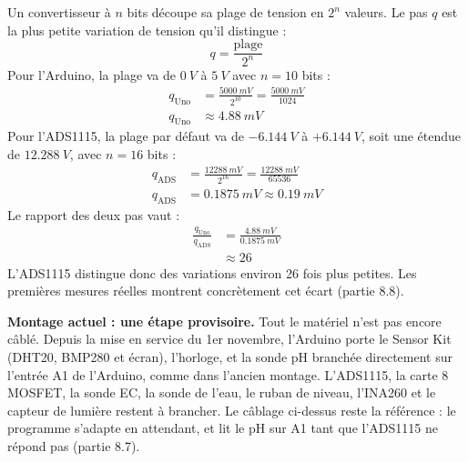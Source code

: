 \begin{demonstration}
Un convertisseur à $n$ bits découpe sa plage de tension en $2^n$ valeurs. Le pas $q$ est la plus petite variation de tension qu'il distingue :
\[
q = \frac{\text{plage}}{2^{n}}
\]
Pour l'Arduino, la plage va de $\qty{0}{V}$ à $\qty{5}{V}$ avec $n = 10$ bits :
\begin{align*}
q_{\mathrm{Uno}} &= \frac{\qty{5000}{mV}}{2^{10}} = \frac{\qty{5000}{mV}}{1024}\\
q_{\mathrm{Uno}} &\approx \qty{4,88}{mV}
\end{align*}
Pour l'ADS1115, la plage par défaut va de $-\qty{6,144}{V}$ à $+\qty{6,144}{V}$, soit une étendue de $\qty{12,288}{V}$, avec $n = 16$ bits :
\begin{align*}
q_{\mathrm{ADS}} &= \frac{\qty{12288}{mV}}{2^{16}} = \frac{\qty{12288}{mV}}{65536}\\
q_{\mathrm{ADS}} &= \qty{0,1875}{mV} \approx \qty{0,19}{mV}
\end{align*}
Le rapport des deux pas vaut :
\begin{align*}
\frac{q_{\mathrm{Uno}}}{q_{\mathrm{ADS}}} &= \frac{\qty{4,88}{mV}}{\qty{0,1875}{mV}}\\
&\approx 26
\end{align*}
L'ADS1115 distingue donc des variations environ 26 fois plus petites. Les premières mesures réelles montrent concrètement cet écart (partie 8.8).
\end{demonstration}

\begin{attention}
\textbf{Montage actuel : une étape provisoire.} Tout le matériel n'est pas encore câblé. Depuis la mise en service du 1er novembre, l'Arduino porte le Sensor Kit (DHT20, BMP280 et écran), l'horloge, et la sonde pH branchée directement sur l'entrée A1 de l'Arduino, comme dans l'ancien montage. L'ADS1115, la carte 8 MOSFET, la sonde EC, la sonde de l'eau, le ruban de niveau, l'INA260 et le capteur de lumière restent à brancher. Le câblage ci-dessus reste la référence : le programme s'adapte en attendant, et lit le pH sur A1 tant que l'ADS1115 ne répond pas (partie 8.7).
\end{attention}

